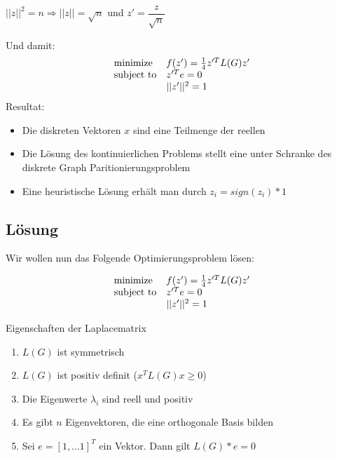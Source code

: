 \begin{center}
	$||z||^2 = n \Rightarrow ||z|| = \sqrt{n}$ und $z' = \dfrac{z}{\sqrt{n}}$
\end{center}
Und damit:
\begin{equation*}
\begin{array}{ll@{}ll}
\text{minimize}  & f(z')=\frac{1}{4}z'^TL(G)z' &\\
\text{subject to}& z'^Te = 0  &    \\
                 & ||z'||^2 = 1 & 
\end{array}
\end{equation*}
Resultat:
\begin{itemize}
	\item Die diskreten Vektoren $x$ sind eine Teilmenge der reellen
	\item Die Lösung des kontinuierlichen Problems stellt eine unter Schranke des diskrete Graph Paritionierungsproblem 
	\item Eine heuristische Lösung erhält man durch $z_i = sign(z_i)*1 $ 
\end{itemize}

\subsection{Lösung}

Wir wollen nun das Folgende Optimierungsproblem lösen:

\begin{equation*}
\begin{array}{ll@{}ll}
\text{minimize}  & f(z')=\frac{1}{4}z'^TL(G)z' &\\
\text{subject to}& z'^Te = 0  &    \\
                 & ||z'||^2 = 1 & 
\end{array}
\end{equation*}

\begin{mysatz*}
	Eigenschaften der Laplacematrix 
	\begin{enumerate}
		\item $L(G)$ ist symmetrisch
		\item $L(G)$ ist positiv definit ($x^TL(G)x \geq 0$)
		\item Die Eigenwerte $\lambda_i$ sind reell und positiv
		\item Es gibt $n$ Eigenvektoren, die eine orthogonale Basis bilden
		\item Sei $e=[1,...1]^T$ ein Vektor. Dann gilt $L(G)*e = 0$
	\end{enumerate}
\end{mysatz*}

